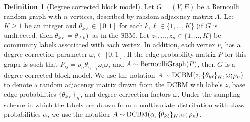 \documentclass[
  12pt,
]{article}
\theoremstyle{definition}
\newtheorem{definition}{Definition}[section]
\theoremstyle{definition}
\theoremstyle{definition}
\theoremstyle{definition}
\theoremstyle{remark}
\begin{document}
\begin{definition}[Degree corrected block model]
\label{def:dcbm}
Let $G = (V, E)$ be a Bernoulli random graph with $n$ vertices, described by random adjacency matrix $A$. 
Let $K \geq 1$ be an integer and $\theta_{k \ell} \in [0, 1]$ for each $k, \ell \in \{1, ..., K\}$ (if $G$ is undirected, then $\theta_{k \ell} = \theta_{\ell k}$), as in the SBM. 
Let $z_1, ..., z_n \in \{1, ..., K\}$ be community labels associated with each vertex. 
In addition, each vertex $v_i$ has a degree correction parameter $\omega_i \in [0, 1]$. 
If the edge probability matrix $P$ for this graph is such that $P_{ij} = \rho_n \theta_{z_i, z_j} \omega_i \omega_j$ and $A \sim \mathrm{BernoulliGraph}(P)$, then $G$ is a degree corrected block model. 
We use the notation $A \sim \mathrm{DCBM}(z, \{\theta_{k \ell}\}_K, \omega; \rho_n)$ to denote a random adjacency matrix drawn from the DCBM with labels $z$, base edge probabilities $\{\theta_{k \ell}\}_K$, and degree correction factors $\omega$. 
Under the sampling scheme in which the labels are drawn from a multivariate distribution with class probabilities $\alpha$, we use the notation $A \sim \mathrm{DCBM}(\alpha, \{\theta_{k \ell}\}_K, \omega; \rho_n)$.
\end{definition}
\end{document}
